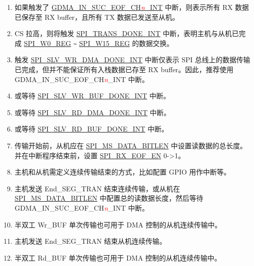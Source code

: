 \documentclass[main\_\_CN.tex]{subfiles}
\begin{document}
\begin{tiplisting}
\vspace{-2em}
\begin{enumerate}
\item 如果触发了 \hyperref[int:GDMAINSUCEOFINT]{GDMA\_IN\_SUC\_EOF\_CH\textcolor{red}{\it{n}}\_INT}  中断，则表示所有 RX 数据已保存至 RX buffer，且所有 TX 数据已发送至从机\label{other:spi-item-gp-spi2-slave-interrupts-note-1}。
\item CS 拉高，则将触发 \hyperref[int:SPITRANSDONEINT]{SPI\_TRANS\_DONE\_INT} 中断，表明主机与从机已完成 \hyperref[regdesc:SPIW0REG]{SPI\_W0\_REG} \verb+~+ \hyperref[regdesc:SPIW15REG]{SPI\_W15\_REG} 的数据交换\label{other:spi-item-gp-spi2-slave-interrupts-note-2}。
\item 触发 \hyperref[int:SPISLVWRDMADONEINT]{SPI\_SLV\_WR\_DMA\_DONE\_INT} 中断仅表示 SPI 总线上的数据传输已完成，但并不能保证所有入栈数据已存至 RX buffer。因此，推荐使用 GDMA\_IN\_SUC\_EOF\_CH\textcolor{red}{\it{n}}\_INT 中断\label{other:spi-item-gp-spi2-slave-interrupts-note-3}。
\vspace{-1em}
\item 或等待 \hyperref[int:SPISLVWRBUFDONEINT]{SPI\_SLV\_WR\_BUF\_DONE\_INT}\label{other:spi-item-gp-spi2-slave-interrupts-note-4} 中断。
\item 或等待 \hyperref[int:SPISLVRDDMADONEINT]{SPI\_SLV\_RD\_DMA\_DONE\_INT}\label{other:spi-item-gp-spi2-slave-interrupts-note-5} 中断。
\item 或等待 \hyperref[int:SPISLVRDBUFDONEINT]{SPI\_SLV\_RD\_BUF\_DONE\_INT}\label{other:spi-item-gp-spi2-slave-interrupts-note-6} 中断。
\item 传输开始前，从机应在 \hyperref[fielddesc:SPIMSDATABITLEN]{SPI\_MS\_DATA\_BITLEN} 中设置读数据的总长度。并在中断程序结束前，设置 \hyperref[fielddesc:SPIRXEOFEN]{SPI\_RX\_EOF\_EN} 0->1\label{other:spi-item-gp-spi2-slave-interrupts-note-7}。
\item 主机和从机需定义连续传输结束的方式，比如配置 GPIO 用作中断等。\label{other:spi-item-gp-spi2-slave-interrupts-note-8}
\item 主机发送 End\_SEG\_TRAN 结束连续传输，或从机在 \hyperref[fielddesc:SPIMSDATABITLEN]{SPI\_MS\_DATA\_BITLEN} 中配置总的读数据长度，然后等待 GDMA\_IN\_SUC\_EOF\_CH\textcolor{red}{\it{n}}\_INT\label{other:spi-item-gp-spi2-slave-interrupts-note-9} 中断。
\item 半双工 Wr\_BUF 单次传输也可用于 DMA 控制的从机连续传输中。\label{other:spi-item-gp-spi2-slave-interrupts-note-10}
\item 主机发送 End\_SEG\_TRAN 结束从机连续传输。\label{other:spi-item-gp-spi2-slave-interrupts-note-11}
\item 半双工 Rd\_BUF 单次传输也可用于 DMA 控制的从机连续传输中。\label{other:spi-item-gp-spi2-slave-interrupts-note-12}
\end{enumerate}
\end{tiplisting}
\end{document}
